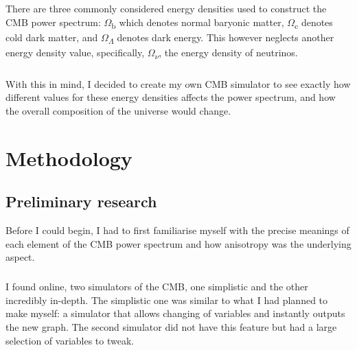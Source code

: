 \documentclass[twoside, fontsize=12pt,
     bibliography=totoc, %
     listof=totoc, %
     index=totoc, %
     onehalfspacing %
]{_MScDiss2017_cls}
\begin{document}
\paragraph{}

There are three commonly considered energy densities used to construct the CMB power spectrum: $\Omega$\textsubscript{b} which denotes normal baryonic matter, $\Omega$\textsubscript{c} denotes cold dark matter, and $\Omega$\textsubscript{$\Lambda$} denotes dark energy. This however neglects another energy density value, specifically, $\Omega$\textsubscript{$\nu$}, the energy density of neutrinos. 

\paragraph{}

With this in mind, I decided to create my own CMB simulator to see exactly how different values for these energy densities affects the power spectrum, and how the overall composition of the universe would change.

\chapter{Methodology}

\section{Preliminary research}
Before I could begin, I had to first familiarise myself with the precise meanings of each element of the CMB power spectrum and how anisotropy was the underlying aspect.

\paragraph{}

I found online, two simulators of the CMB, one simplistic and the other incredibly in-depth. \cite{SimpleCMB} The simplistic one was similar to what I had planned to make myself: a simulator that allows changing of variables and instantly outputs the new graph. The second simulator did not have this feature but had a large selection of variables to tweak. \cite{LambdaToolsCMBSimulator}

\paragraph{}
\end{document}
